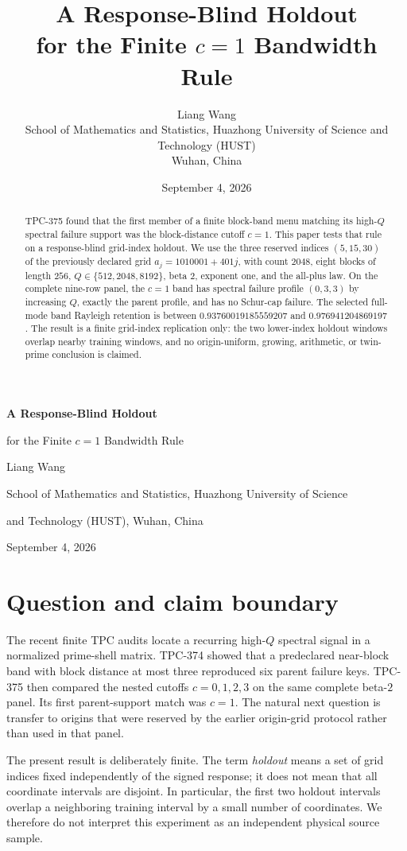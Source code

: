 \documentclass[10pt]{article}
\title{A Response-Blind Holdout\\
for the Finite \(c=1\) Bandwidth Rule}
\author{Liang Wang\\
School of Mathematics and Statistics, Huazhong University of Science and
Technology (HUST)\\
Wuhan, China}
\date{September 4, 2026}
\begin{document}
\begin{center}
{\Large\bfseries A Response-Blind Holdout\par}
{\large for the Finite \(c=1\) Bandwidth Rule\par}
\vspace{4pt}
{\normalsize Liang Wang\par}
{\small School of Mathematics and Statistics, Huazhong University of Science\par
and Technology (HUST), Wuhan, China\par}
{\small September 4, 2026\par}
\end{center}
\small

\begin{abstract}
TPC-375 found that the first member of a finite block-band menu matching its
high-$Q$ spectral failure support was the block-distance cutoff $c=1$.
This paper tests that rule on a response-blind grid-index holdout.  We use
the three reserved indices $(5,15,30)$ of the previously declared grid
$a_j=1010001+401j$, with count $2048$, eight blocks of length $256$,
$Q\in\{512,2048,8192\}$, beta $2$, exponent one, and the all-plus law.
On the complete nine-row panel, the $c=1$ band has spectral failure profile
$(0,3,3)$ by increasing $Q$, exactly the parent profile, and has no Schur-cap
failure.  The selected full-mode band Rayleigh retention is between
$0.93760019185559207$ and $0.976941204869197$.  The result is a finite
grid-index replication only: the two lower-index holdout windows overlap
nearby training windows, and no origin-uniform, growing, arithmetic, or
twin-prime conclusion is claimed.
\end{abstract}

\section{Question and claim boundary}

The recent finite TPC audits locate a recurring high-$Q$ spectral signal in
a normalized prime-shell matrix.  TPC-374 showed that a predeclared
near-block band with block distance at most three reproduced six parent
failure keys.  TPC-375 then compared the nested cutoffs $c=0,1,2,3$ on the
same complete beta-$2$ panel.  Its first parent-support match was $c=1$.
The natural next question is transfer to origins that were reserved by the
earlier origin-grid protocol rather than used in that panel.

The present result is deliberately finite.  The term \textit{holdout} means
a set of grid indices fixed independently of the signed response; it does not
mean that all coordinate intervals are disjoint.  In particular, the first
two holdout intervals overlap a neighboring training interval by a small
number of coordinates.  We therefore do not interpret this experiment as an
independent physical source sample.
\end{document}
